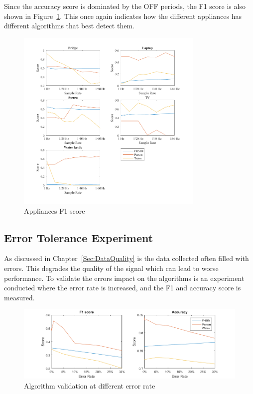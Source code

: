 Since the accuracy score is dominated by the OFF periods, the F1 score is also shown in Figure~\ref{fig:AppF1}. This once again indicates how the different appliances has different algorithms that best detect them.  


\begin{figure}[H]
\centering
\includegraphics[width=0.8\textwidth]{billeder/App-F1Score.png}
\caption{Appliances F1 score}
\label{fig:AppF1}
\end{figure}

\newpage

\subsection{Error Tolerance Experiment}
\label{Sec:ETE}
As discussed in Chapter~\ref{Sec:DataQuality} is the data collected often filled with errors. This degrades the quality of the signal which can lead to worse performance. To validate the errors impact on the algorithms is an experiment conducted where the error rate is increased, and the F1 and accuracy score is measured. 

\begin{figure}[H]
\centering
\includegraphics[width=1\textwidth]{billeder/AlgoErrorRate.png}
\caption{Algorithm validation at different error rate}
\label{fig:ErrorEx}
\end{figure}

